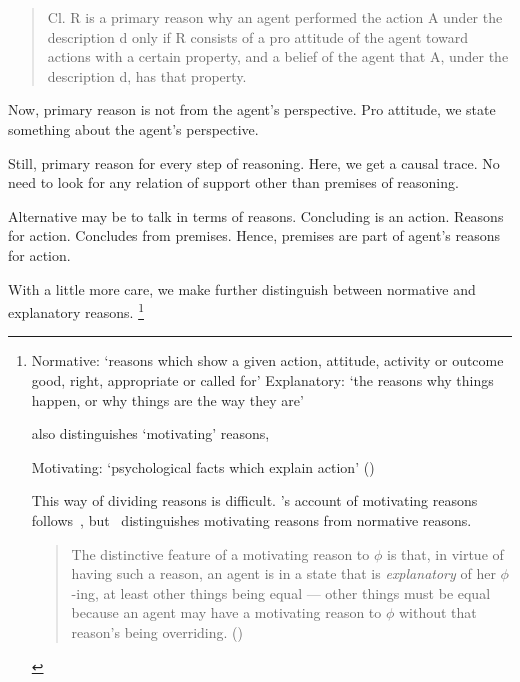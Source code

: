 \begin{note}
  \begin{quote}
    Cl. R is a primary reason why an agent performed the action A under the description d only if R consists of a pro attitude of the agent toward actions with a certain property, and a belief of the agent that A, under the description d, has that property.
  \end{quote}
  Now, primary reason is not from the agent's perspective.
  Pro attitude, we state something about the agent's perspective.

  Still, primary reason for every step of reasoning.
  Here, we get a causal trace.
  No need to look for any relation of support other than premises of reasoning.
\end{note}

\begin{note}
  Alternative may be to talk in terms of reasons.
  Concluding is an action.
  Reasons for action.
  Concludes from premises.
  Hence, premises are part of agent's reasons for action.

  With a little more care, we make further distinguish between normative and explanatory reasons.%
  \footnote{
    Normative: `reasons which show a given action, attitude, activity or outcome good, right, appropriate or called for'
    Explanatory: `the reasons why things happen, or why things are the way they are'
    \citeyear[410]{Hieronymi:2011aa}

    \citeauthor{Hieronymi:2011aa} also distinguishes `motivating' reasons,

    Motivating: `psychological facts which explain action'
    (\citeyear[411--412]{Hieronymi:2011aa})

    This way of dividing reasons is difficult.
    \citeauthor{Hieronymi:2011aa}'s account of motivating reasons follows~\textcite{Smith:1994wo}, but~\citeauthor{Smith:1994wo} distinguishes motivating reasons from normative reasons.

    \begin{quote}
      The distinctive feature of a motivating reason to \(\phi\) is that, in virtue of having such a reason, an agent is in a state that is \emph{explanatory} of her \(\phi\)-ing, at least other things being equal --- other things must be equal because an agent may have a motivating reason to \(\phi\) without that reason's being overriding.%
      \mbox{}\hfill\mbox{(\citeyear{Smith:1994wo})}
    \end{quote}

}
\end{note}
